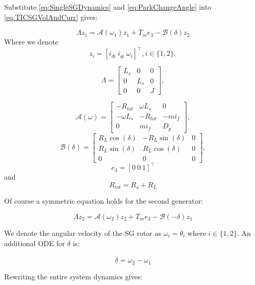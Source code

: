 \documentclass[conference]{IEEEtran}
\begin{document}
Substitute \eqref{eq:SingleSGDynamics} and \eqref{eq:ParkChangeAngle} into \eqref{eq:TICSGVolAndCurr}  gives:

\[
\varLambda\dot{z}_{1}=\mathcal{A}(\omega_{1})z_{1}+T_{m}e_{3}-\mathcal{B}(\delta)z_{2}
\]
Where we denote
 \[z_{i}=\left[i_{di}\ i_{qi}\  \omega_{i}\right]^\top,i\in\{1,2\},\]

\[
\varLambda=\left[\begin{array}{ccc}
L_{s} & 0 & 0\\
0 & L_{s} & 0\\
0 & 0 & J
\end{array}\right],
\]

\[
\mathcal{A}(\omega)=\left[\begin{array}{ccc}
-R_{tot} & \omega L_{s} & 0\\
-\omega L_{s} & -R_{tot} & -mi_{f}\\
0 & mi_{f} & D_{p}
\end{array}\right],
\]
\[\mathcal{B}(\delta)=\left[\begin{array}{ccc}
R_{L}\cos(\delta) & -R_{L}\sin(\delta) & 0\\
R_{L}\sin(\delta) & R_{L}\cos(\delta) & 0\\
0 & 0 & 0
\end{array}\right],
\]
\[e_{3}=\left[0\ 0\ 1\right]^\top\] and
\[ R_{tot}=R_{s}+R_{L} \]

Of course a symmetric equation holds for the second generator:

\[
\varLambda\dot{z}_{2}=\mathcal{A}(\omega_{2})z_{2}+T_{m}e_{3}-\mathcal{B}(-\delta)z_{1}
\]

We denote the angular velocity  of the SG rotor as $\omega_i = \dot{\theta_i}$ where $i \in \{1,2\}$. 
An additional ODE for $\delta$ is:

\[
\dot{\delta}=\omega_{2}-\omega_{1}
\]

Rewriting the entire system dynamics gives:
\end{document}
